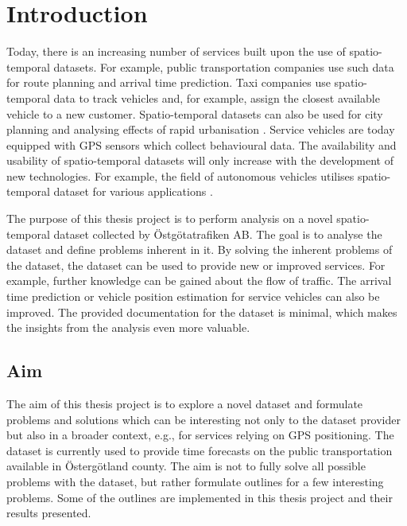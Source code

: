\chapter{Introduction}
\label{cha:introduction}

Today, there is an increasing number of services built upon the use of spatio-temporal datasets.
For example, public transportation companies use such data for route planning and arrival time prediction.
Taxi companies use spatio-temporal data to track vehicles and, for example, assign the closest available vehicle to a new customer.
Spatio-temporal datasets can also be used for city planning and analysing effects of rapid urbanisation \cite{Deng2009, Liu2005}.
Service vehicles are today equipped with GPS sensors which collect behavioural data.
The availability and usability of spatio-temporal datasets will only increase with the development of new technologies.
For example, the field of autonomous vehicles utilises spatio-temporal dataset for various applications \cite{Dickmanns1990, Peng2018}.

The purpose of this thesis project is to perform analysis on a novel spatio-temporal dataset collected by Östgötatrafiken AB.
The goal is to analyse the dataset and define problems inherent in it.
By solving the inherent problems of the dataset, the dataset can be used to provide new or improved services.
For example, further knowledge can be gained about the flow of traffic.
The arrival time prediction or vehicle position estimation for service vehicles can also be improved.
The provided documentation for the dataset is minimal, which makes the insights from the analysis even more valuable.

\section{Aim}
\label{sec:aim}
The aim of this thesis project is to explore a novel dataset and formulate problems and solutions which can be interesting not only to the dataset provider but also in a broader context, e.g., for services relying on GPS positioning.
The dataset is currently used to provide time forecasts on the public transportation available in Östergötland county.
The aim is not to fully solve all possible problems with the dataset, but rather formulate outlines for a few interesting problems.
Some of the outlines are implemented in this thesis project and their results presented.

